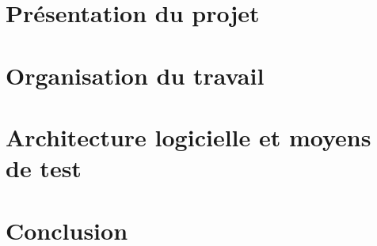 \documentclass[a4paper,11pt]{article}
\begin{document}
\pagestyle{plain}


\makeTitlePage %

\clearpage

\selectfont

\tableofcontents

\clearpage

\section{Présentation du projet}


\section{Organisation du travail}


\section{Architecture logicielle et moyens de test}


\section{Conclusion}


\makeAbstractPage
\pagestyle{empty}
\end{document}
